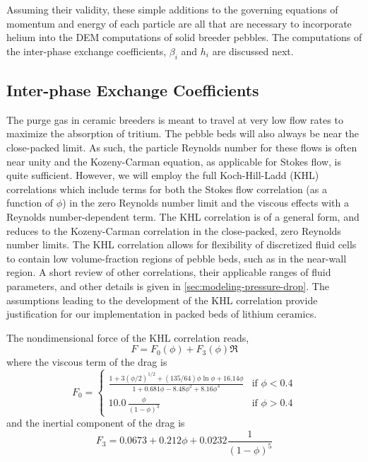 Assuming their validity, these simple additions to the governing equations of momentum and energy of each particle are all that are necessary to incorporate helium into the DEM computations of solid breeder pebbles. The computations of the inter-phase exchange coefficients, $\beta_i$ and $h_i$ are discussed next.

\subsection{Inter-phase Exchange Coefficients}

The purge gas in ceramic breeders is meant to travel at very low flow rates to maximize the absorption of tritium. The pebble beds will also always be near the close-packed limit. As such, the particle Reynolds number for these flows is often near unity and the Kozeny-Carman equation, as applicable for Stokes flow, is quite sufficient. However, we will employ the full Koch-Hill-Ladd (KHL) correlations which include terms for both the Stokes flow correlation (as a function of $\phi$) in the zero Reynolds number limit and the viscous effects with a Reynolds number-dependent term. The KHL correlation is of a general form, and reduces to the Kozeny-Carman correlation in the close-packed, zero Reynolds number limits.\cite{Koch2001} The KHL correlation allows for flexibility of discretized fluid cells to contain low volume-fraction regions of pebble beds, such as in the near-wall region. A short review of other correlations, their applicable ranges of fluid parameters, and other details is given in \cref{sec:modeling-pressure-drop}. The assumptions leading to the development of the KHL correlation provide justification for our implementation in packed beds of lithium ceramics.

The nondimensional force of the KHL correlation reads,
\begin{equation}\label{eq:khl-correlation}
	F = F_0(\phi) + F_3(\phi)\Re
\end{equation}
where the viscous term of the drag is
\begin{equation}
F_0 = \begin{cases}
	\frac{1+3(\phi/2)^{1/2} + (135/64)\phi\ln\phi + 16.14\phi}{1 + 0.681\phi - 8.48 \phi^2 + 8.16\phi^3} & \text{if $\phi < 0.4$}\\
	10.0\,\frac{\phi}{(1-\phi)^3} & \text{if $\phi > 0.4$} 
	\end{cases}
\end{equation}
and the inertial component of the drag is
\begin{equation}
	F_3 = 0.0673 + 0.212\phi + 0.0232 \frac{1}{(1-\phi)^5}
\end{equation}

